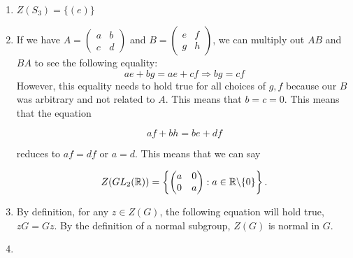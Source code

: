 \documentclass[12pt]{report}
\begin{document}
\sol

\sol

\sol
\begin{enumerate}[label=\alph*.]
    \item $Z(S_3) = \{ (e) \}$
    \item If we have $A = \begin{pmatrix}
        a & b \\
        c & d
    \end{pmatrix}$ and $B =\begin{pmatrix}
        e & f \\
        g & h
    \end{pmatrix}$, we can multiply out $AB$ and $BA$ to see the following equality:
    $$ae + bg = ae + cf \Rightarrow bg = cf$$
    However, this equality needs to hold true for all choices of $g,f$ because our $B$ was arbitrary and not related to $A$. This means that $b= c =0$. This means that the equation

    $$af + bh = be + df$$

    reduces to $af = df$ or $a=d$. This means that we can say 

    $$Z(GL_2(\RR)) = \left\{\begin{pmatrix}
        a & 0 \\
        0 & a
    \end{pmatrix} : a \in \RR \backslash \{0\} \right\}.$$
    \item By definition, for any $z \in Z(G)$, the following equation will hold true, $zG=Gz$. By the definition of a normal subgroup, $Z(G)$ is normal in $G$. 
    \item 

\end{enumerate}
\end{document}

